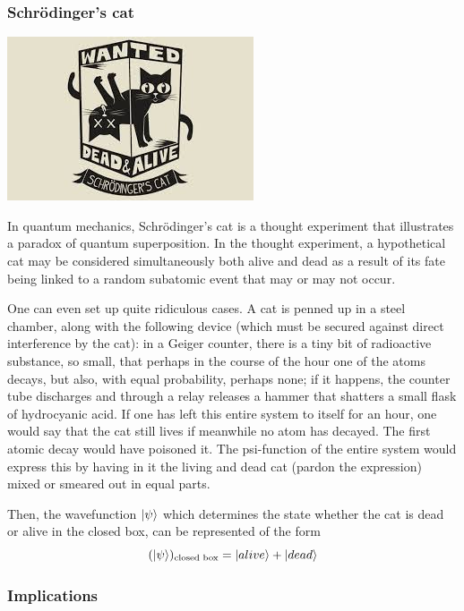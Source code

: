 \documentclass{article}
\begin{document}
\subsubsection{Schrödinger's cat}
\label{subsec:Schrödinger's cat}
\begin{center}
    \includegraphics[scale=1]{sch_cat.jpeg}
\end{center}
In quantum mechanics, Schrödinger's cat is a thought experiment that illustrates a paradox of quantum superposition. In the thought experiment, a hypothetical cat may be considered simultaneously both alive and dead as a result of its fate being linked to a random subatomic event that may or may not occur.
\begin{displayquote}
 One can even set up quite ridiculous cases. A cat is penned up in a steel chamber, along with the following device (which must be secured against direct interference by the cat): in a Geiger counter, there is a tiny bit of radioactive substance, so small, that perhaps in the course of the hour one of the atoms decays, but also, with equal probability, perhaps none; if it happens, the counter tube discharges and through a relay releases a hammer that shatters a small flask of hydrocyanic acid. If one has left this entire system to itself for an hour, one would say that the cat still lives if meanwhile no atom has decayed. The first atomic decay would have poisoned it. The psi-function of the entire system would express this by having in it the living and dead cat (pardon the expression) mixed or smeared out in equal parts. 
\end{displayquote}
Then, the wavefunction $\ket{\psi}$ which determines the state whether the cat is dead or alive in the closed box, can be represented of the form
\begin{equation*}
    (\ket{\psi})_{\text{closed box}} = \ket{alive} + \ket{dead}
\end{equation*}
\subsubsection{Implications}
\label{subsec:Implications}
\end{document}

